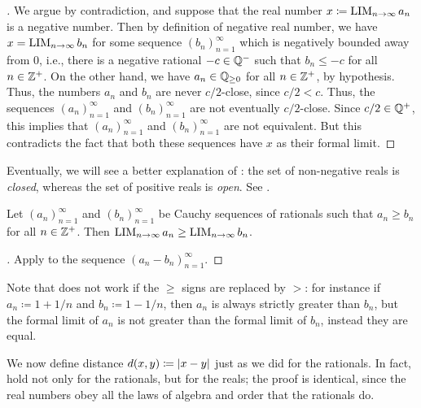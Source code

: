 \begin{proof}[]
  We argue by contradiction, and suppose that the real number \(x \coloneqq \operatorname*{LIM}_{n \to \infty} a_n\) is a negative number.
  Then by definition of negative real number, we have \(x = \operatorname*{LIM}_{n \to \infty} b_n\) for some sequence \((b_n)_{n = 1}^\infty\) which is negatively bounded away from \(0\), i.e., there is a negative rational \(-c \in \mathbb{Q}^-\) such that \(b_n \leq -c\) for all \(n \in \mathbb{Z}^+\).
  On the other hand, we have \(a_n \in \mathbb{Q}_{\geq 0}\) for all \(n \in \mathbb{Z}^+\), by hypothesis.
  Thus, the numbers \(a_n\) and \(b_n\) are never \(c / 2\)-close, since \(c / 2 < c\).
  Thus, the sequences \((a_n)_{n = 1}^{\infty}\) and \((b_n)_{n = 1}^{\infty}\) are not eventually \(c / 2\)-close.
  Since \(c / 2 \in \mathbb{Q}^+\), this implies that \((a_n)_{n = 1}^{\infty}\) and \((b_n)_{n = 1}^{\infty}\) are not equivalent.
  But this contradicts the fact that both these sequences have \(x\) as their formal limit.
\end{proof}

\begin{note}
  Eventually, we will see a better explanation of :
  the set of non-negative reals is \emph{closed}, whereas the set of positive reals is \emph{open}.
  See .
\end{note}

\begin{cor}\label{i:5.4.10}
  Let \((a_n)_{n = 1}^{\infty}\) and \((b_n)_{n = 1}^{\infty}\) be Cauchy sequences of rationals such that \(a_n \geq b_n\) for all \(n \in \mathbb{Z}^+\).
  Then \(\operatorname*{LIM}_{n \to \infty} a_n \geq \operatorname*{LIM}_{n \to \infty} b_n\).
\end{cor}

\begin{proof}[]
  Apply  to the sequence \((a_n - b_n)_{n = 1}^\infty\).
\end{proof}

\begin{rmk}\label{i:5.4.11}
  Note that  does not work if the \(\geq\) signs are replaced by \(>\):
  for instance if \(a_n \coloneqq 1 + 1 / n\) and \(b_n \coloneqq 1 - 1 / n\), then \(a_n\) is always strictly greater than \(b_n\), but the formal limit of \(a_n\) is not greater than the formal limit of \(b_n\), instead they are equal.
\end{rmk}

\begin{ac}\label{i:ac:5.4.1}
  We now define distance \(d(x, y) \coloneqq \left\lvert x - y\right\rvert\) just as we did for the rationals.
  In fact,  hold not only for the rationals, but for the reals;
  the proof is identical, since the real numbers obey all the laws of algebra and order that the rationals do.
\end{ac}

